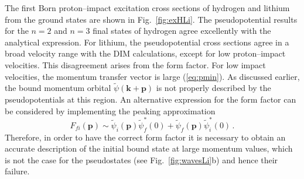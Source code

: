 \documentclass[10pt]{article}
\begin{document}
The first Born proton--impact excitation cross sections of hydrogen 
and lithium from the ground states are shown in Fig.~\ref{fig:exHLi}.
The pseudopotential results for the $n=2$ and $n=3$ final states of
hydrogen agree excellently with the analytical expression. For 
lithium, the pseudopotential cross sections agree in a broad velocity 
range with the DIM calculations, except for low proton--impact velocities. 
This disagreement arises from the form 
factor. For low impact velocities, the momentum transfer vector is large 
(\ref{eq:pmin}). As discussed earlier, the bound momentum orbital
$\widetilde{\psi}(\mathbf{k}+\mathbf{p})$ is not properly described 
by the pseudopotentials at this region. 
An alternative expression for the form factor can
be considered by implementing the peaking approximation
\begin{equation}
 F_{\!fi}(\mathbf{p}) \sim \widetilde{\psi}_i(\mathbf{p})\widetilde{\psi}_{\!f}^*(0)
 +\widetilde{\psi}_{\!f}(\mathbf{p})\widetilde{\psi}_i^*(0)\,.
\end{equation}
Therefore, in order to have the correct form factor it is necessary to 
obtain an accurate description of the initial bound state at large
momentum values, which is not the case for the pseudostates (see 
Fig.~\ref{fig:wavesLi}b) and hence their failure.
\end{document}
